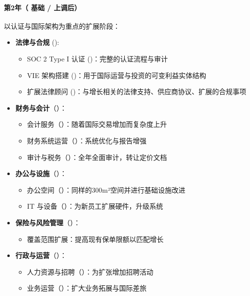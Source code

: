 \documentclass[11pt, a4paper, oneside]{article}
\begin{document}
\paragraph{第2年（ 基础 /  上调后）}
以认证与国际架构为重点的扩展阶段：

\begin{itemize}
    \item \textbf{法律与合规} ():
    \begin{itemize}
        \item SOC 2 Type I 认证 ()：完整的认证流程与审计
        \item VIE 架构搭建 ()：用于国际运营与投资的可变利益实体结构
        \item 扩展法律顾问 ()：与增长相关的法律支持、供应商协议、扩展的合规事项
    \end{itemize}



\item \textbf{财务与会计}（）：
\begin{itemize}
    \item 会计服务（）：随着国际交易增加而复杂度上升
    \item 财务系统运营（）：系统优化与报告增强
    \item 审计与税务（）：全年全面审计，转让定价文档
\end{itemize}

\item \textbf{办公与设施}（）：
\begin{itemize}
    \item 办公空间（）：同样的300m²空间并进行基础设施改进
    \item IT 与设备（）：为新员工扩展硬件，升级系统
\end{itemize}

\item \textbf{保险与风险管理}（）：
\begin{itemize}
    \item 覆盖范围扩展：提高现有保单限额以匹配增长
\end{itemize}

\item \textbf{行政与运营}（）：
\begin{itemize}
    \item 人力资源与招聘（）：为扩张增加招聘活动
    \item 业务运营（）：扩大业务拓展与国际差旅
\end{itemize}
\end{itemize}
\end{document}
